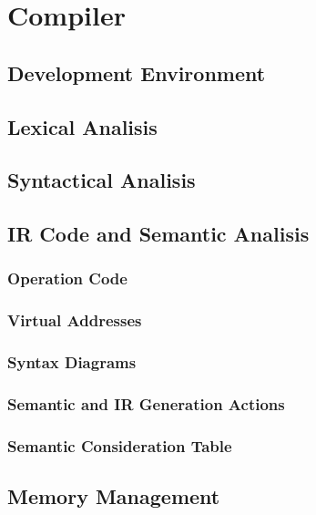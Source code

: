 
\chapter{Compiler}

\section{Development Environment}

\section{Lexical Analisis}

\section{Syntactical Analisis}

\section{IR Code and Semantic Analisis}
\subsection{Operation Code}
\subsection{Virtual Addresses}
\subsection{Syntax Diagrams}
\subsection{Semantic and IR Generation Actions}
\subsection{Semantic Consideration Table}

\section{Memory Management}
